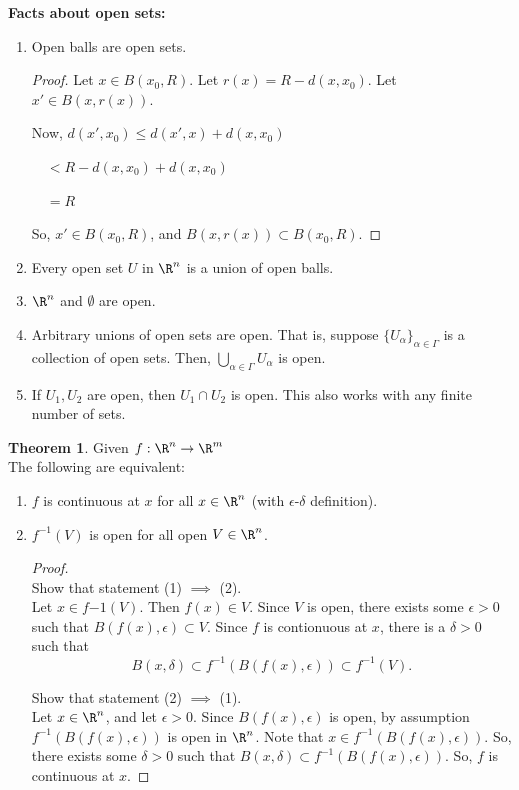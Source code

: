 \documentclass[a5paper]{article}
\theoremstyle{definition}%
\newtheorem*{theorem*}{Theorem} %
\numberwithin{exercise}{section}
\theoremstyle{remark}%
\begin{document}
\noindent \textbf{Facts about open sets:}
\begin{enumerate}
\item Open balls are open sets. 
\begin{proof}
Let $x \in B(x_0,R)$. Let $r(x)=R-d(x,x_0)$. Let $x' \in B(x,r(x))$. 

Now, $d(x',x_0) \leq d(x',x) + d(x,x_0)$

$\quad < R-d(x,x_0) + d(x,x_0)$

$\quad = R$

So, $x' \in B(x_0,R)$, and $B(x,r(x)) \subset B(x_0,R)$.
\end{proof}
\item Every open set $U$ in $\R^n $ is a union of open balls. 
\item $\R^n$ and $\emptyset$ are open. 
\item Arbitrary unions of open sets are open. That is, suppose $\{U_\alpha\}_{\alpha \in \Gamma}$ is a collection of open sets. Then, $\bigcup_{\alpha \in \Gamma} U_\alpha$ is open. 
\item If $U_1, U_2$ are open, then $U_1 \cap U_2$ is open. This also works with any finite number of sets. 
\end{enumerate}

\begin{theorem*}
Given $f:\R^n \to \R^m$\\
The following are equivalent:
\begin{enumerate}
\item $f$ is continuous at $x$ for all $x \in \R^n$ (with $\epsilon$-$\delta$ definition).
\item $f^{-1}(V)$ is open for all open $V \in \R^n$. 
\begin{proof}\mbox{}\\
Show that statement (1) $\implies$ (2). \\
Let $x \in f{-1}(V)$. Then $f(x) \in V$. Since $V$ is open, there exists some $\epsilon > 0$ such that $B(f(x),\epsilon)\subset V$. Since $f$ is contionuous at $x$, there is a $\delta >0$ such that 
$$B(x,\delta)\subset f^{-1}(B(f(x),\epsilon)) \subset	f^{-1}(V).$$ 

Show that statement (2) $\implies$ (1).\\
Let $x \in \R^n$, and let $\epsilon >0$. Since $B(f(x),\epsilon)$ is open, by assumption $f^{-1}(B(f(x),\epsilon))$ is open in $\R^n$. Note that $x \in f^{-1}(B(f(x),\epsilon))$. So, there exists some $\delta >0$ such that $B(x,\delta) \subset f^{-1}(B(f(x),\epsilon))$. So, $f$ is continuous at $x$. 
\end{proof}
\end{enumerate}
\end{theorem*}
\end{document}
